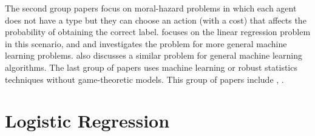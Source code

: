 \documentclass{article}
\begin{document}
The second group papers focus on moral-hazard problems in which each agent does not have a type but they can choose an action (with a cost) that affects the probability of obtaining the correct label. \citet*{richardsonprivately} focuses on the linear regression problem in this scenario, and \citet*{cai2015optimum} and \citet*{shah2016double} investigates the problem for more general machine learning problems. \citet*{mihailescu2010strategy} also discusses a similar problem for general machine learning algorithms.
\newline \newline
The last group of papers uses machine learning or robust statistics techniques without game-theoretic models. This group of papers include \citet*{dekel2009vox}, \citet*{dekel2009good}.
\newline \newline



\section{Logistic Regression} 
\end{document}
